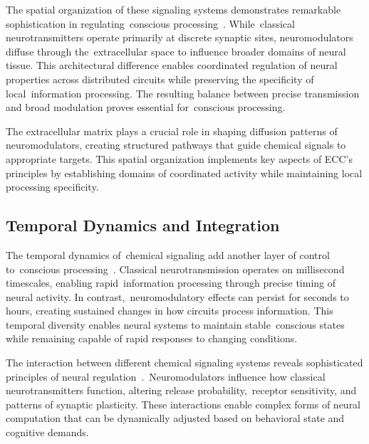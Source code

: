 The spatial organization of these signaling systems demonstrates remarkable sophistication in regulating~conscious processing~\cite{Bargmann2012, Verkhratsky2018}. While~classical neurotransmitters operate primarily at discrete synaptic sites, neuromodulators diffuse through the~extracellular space to influence broader domains of neural tissue. This architectural difference enables coordinated regulation of neural properties across distributed circuits while preserving the specificity of local~information processing. The resulting balance between precise transmission and broad modulation proves essential for~conscious processing.

The extracellular matrix plays a crucial role in shaping diffusion patterns of neuromodulators, creating structured pathways that guide chemical signals to appropriate targets. This spatial organization implements key aspects of ECC's principles by establishing domains of coordinated activity while maintaining local processing specificity.

\subsection*{Temporal Dynamics and Integration~}

The temporal dynamics of~chemical signaling add another layer of control to~conscious processing~\cite{Palacios-Filardo2019, pinotsis2023vivo}. Classical neurotransmission operates on millisecond timescales, enabling rapid~information processing through precise timing of neural activity. In contrast,~neuromodulatory effects can persist for seconds to hours, creating sustained changes in how circuits process information. This temporal diversity enables neural systems to maintain stable~conscious states while remaining capable of rapid responses to changing conditions.

The interaction between different chemical signaling systems reveals sophisticated principles of neural regulation~\cite{Dayan2012, breakspear2005dynamics}.~Neuromodulators influence how classical neurotransmitters function, altering release probability,~receptor sensitivity, and patterns of synaptic plasticity. These interactions enable complex forms of neural computation that can be dynamically adjusted based on behavioral state and cognitive demands.

